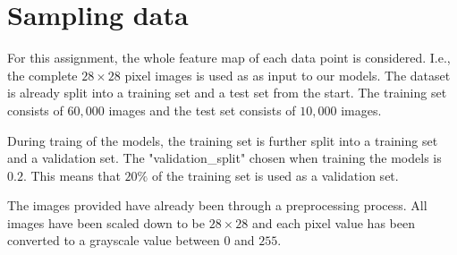 \section{Sampling data}

For this assignment, the whole feature map of each data point is considered. I.e., the complete $28 \times 28$ pixel images is used as as input to our models. The dataset is already split into a training set and a test set from the start. The training set consists of $60,000$ images and the test set consists of $10,000$ images. 
\par
During traing of the models, the training set is further split into a training set and a validation set. The "validation\_split" chosen when training the models is $0.2$. This means that $20\%$ of the training set is used as a validation set. 
\par
The images provided have already been through a preprocessing process. All images have been scaled down to be $28 \times 28$ and each pixel value has been converted to a grayscale value between $0$ and $255$.